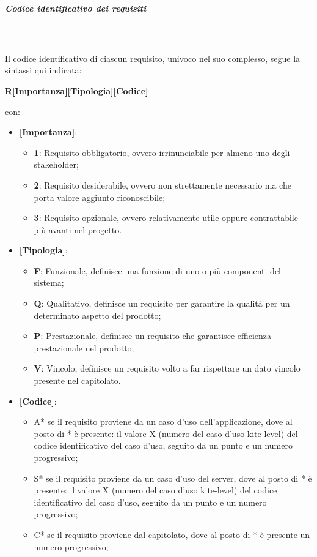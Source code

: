 \subparagraph*{Codice identificativo dei requisiti}\mbox{}\\ \\
Il codice identificativo di ciascun requisito, univoco nel suo complesso, segue la sintassi qui indicata:
\begin{center}
	\textbf{R[Importanza][Tipologia][Codice]}
\end{center}
con:
\begin{itemize}
	\item \textbf{[Importanza]}:
	\begin{itemize}
		\item \textbf{1}: Requisito obbligatorio, ovvero irrinunciabile per almeno uno degli stakeholder;
		\item \textbf{2}: Requisito desiderabile, ovvero non strettamente necessario ma che porta valore aggiunto riconoscibile;
		\item \textbf{3}: Requisito opzionale, ovvero relativamente utile oppure contrattabile più avanti nel progetto.
	\end{itemize}
	\item \textbf{[Tipologia]}:
	\begin{itemize}
		\item \textbf{F}: Funzionale, definisce una funzione di uno o più componenti del sistema;
		\item \textbf{Q}: Qualitativo, definisce un requisito per garantire la qualità per un determinato aspetto del prodotto;
		\item \textbf{P}: Prestazionale, definisce un requisito che garantisce efficienza prestazionale nel prodotto;
		\item \textbf{V}: Vincolo, definisce un requisito volto a far rispettare un dato vincolo presente nel capitolato.
	\end{itemize}
	\item \textbf{[Codice]}:
	\begin{itemize}
		\item A* se il requisito proviene da un caso d'uso dell'applicazione, dove al posto di * è presente: il valore X (numero del caso d'uso kite-level) del codice identificativo del caso d'uso, seguito da un punto e un numero progressivo;
		\item S* se il requisito proviene da un caso d'uso del server, dove al posto di * è presente: il valore X (numero del caso d'uso kite-level) del codice identificativo del caso d'uso, seguito da un punto e un numero progressivo;
		\item C* se il requisito proviene dal capitolato, dove al posto di * è presente un numero progressivo;

\end{itemize}
\end{itemize}
